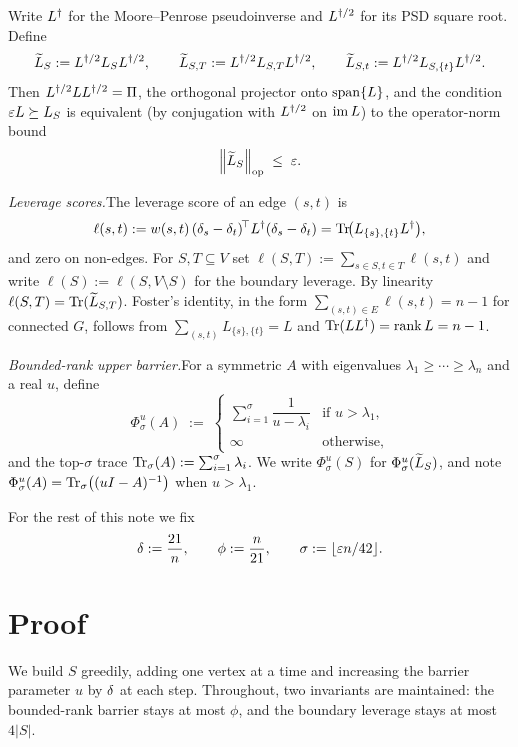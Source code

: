 \documentclass[11pt]{article}
\begin{document}
Write $L^{\dagger}$ for the Moore--Penrose pseudoinverse and $L^{\dagger/2}$ for its PSD square
root. Define
\[
  \widetilde{L}_S      := L^{\dagger/2} L_S L^{\dagger/2}, \qquad
  \widetilde{L}_{S,T}  := L^{\dagger/2} L_{S,T}  L^{\dagger/2}, \qquad
  \widetilde{L}_{S,t}  := L^{\dagger/2} L_{S,\{t\}}L^{\dagger/2}.
\]
Then $L^{\dagger/2} L L^{\dagger/2} = \Pi$, the orthogonal projector onto $\operatorname{span}\{L\}$, and the
condition $\varepsilon L\succeq L_S$ is equivalent (by conjugation with $L^{\dagger/2}$ on
$\operatorname{im} L$) to the operator-norm bound
\begin{equation}\label{eq:opnorm-form}
  \left\lVert \widetilde{L}_S \right\rVert_{\mathrm{op}} \;\le\; \varepsilon.
\end{equation}

\medskip
\noindent\emph{Leverage scores.}\quad The leverage score of an edge $(s,t)$ is
\[
  \ell(s,t)
   := w(s,t)\,(\delta_s-\delta_t)^{\!\top}L^{\dagger}(\delta_s-\delta_t)
    = \operatorname{Tr}\!\bigl(L_{\{s\},\{t\}}L^{\dagger}\bigr),
\]
and zero on non-edges. For $S,T\subseteq V$ set
$\ell(S,T):=\sum_{s\in S,t\in T}\ell(s,t)$ and write
$\ell(S):=\ell(S,V\setminus S)$ for the boundary leverage. By linearity
$\ell(S,T)=\operatorname{Tr}(\widetilde{L}_{S,T})$. Foster's identity, in the form
$\sum_{(s,t)\in E}\ell(s,t)=n-1$ for connected $G$, follows from
$\sum_{(s,t)}L_{\{s\},\{t\}}=L$ and $\operatorname{Tr}(LL^{\dagger})=\operatorname{rank} L = n-1$.

\medskip
\noindent\emph{Bounded-rank upper barrier.}\quad For a symmetric $A$ with
eigenvalues $\lambda_1\ge\cdots\ge\lambda_n$ and a real $u$, define
\[
  \Phi^u_{\sigma}(A) \;:=\;
  \begin{cases}
    \displaystyle\sum_{i=1}^{\sigma}\dfrac{1}{u-\lambda_i} & \text{if } u>\lambda_1,\\[2pt]
    \infty & \text{otherwise,}
  \end{cases}
\]
and the top-$\sigma$ trace $\operatorname{Tr}_{\sigma}(A):=\sum_{i=1}^{\sigma}\lambda_i$. We write
$\Phi^u_\sigma(S)$ for $\Phi^u_\sigma(\widetilde{L}_S)$, and note
$\Phi^u_\sigma(A)=\operatorname{Tr}_{\sigma}\bigl((uI-A)^{-1}\bigr)$ when $u>\lambda_1$.

For the rest of this note we fix
\[
  \delta := \frac{21}{n}, \qquad
  \phi := \frac{n}{21}, \qquad
  \sigma := \lfloor \varepsilon n/42 \rfloor.
\]

\section*{Proof}

We build $S$ greedily, adding one vertex at a time and increasing the barrier
parameter $u$ by $\delta$ at each step. Throughout, two invariants are
maintained: the bounded-rank barrier stays at most $\phi$, and the boundary
leverage stays at most $4|S|$.
\end{document}
